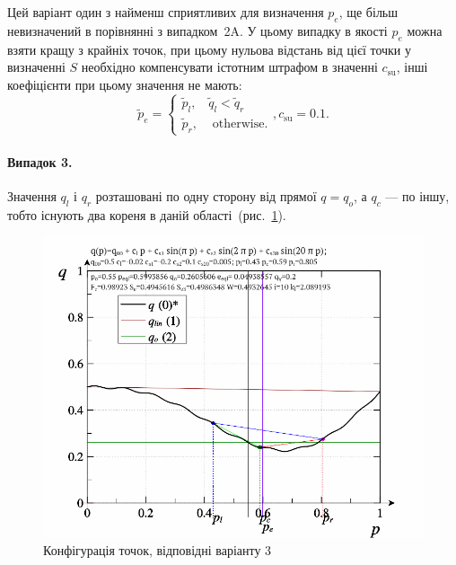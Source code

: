 Цей варіант один з найменш сприятливих для визначення
$p_e$, ще більш невизначений в порівнянні з випадком~2A. У цьому
випадку в якості
$p_e$ можна взяти кращу з крайніх точок, при цьому нульова
відстань від цієї точки у визначенні
$S$ необхідно компенсувати істотним штрафом в значенні
$c_\mathrm{su}$, інші коефіцієнти при цьому значення не мають:
%
\begin{equation}
  \tilde{p}_e
  =
  \begin{cases}
    \tilde{p}_{l}, & \tilde{q}_l < \tilde{q}_r
    \\
    \tilde{p}_{r}, & \text{ otherwise}.
  \end{cases}
  ,
  c_\mathrm{su} = 0.1 .
  \label{atu:eq:pr_e2C}
\end{equation}

\paragraph{Випадок 3.}%
%
Значення
$q_l$ і
$q_r$ розташовані по одну сторону від прямої
$q = q_o$, а
$q_c$ --- по іншу, тобто існують два кореня в даній
області~(рис.~\ref{atu:f:pq_3}).

\begin{figure}[htb!]
  \begin{center}
    \includegraphics[width=60\TW]{p/pq_sin-p_pq_double.png}
  \end{center}
  \caption{Конфігурація точок, відповідні варіанту 3}
  \label{atu:f:pq_3}
\end{figure}

